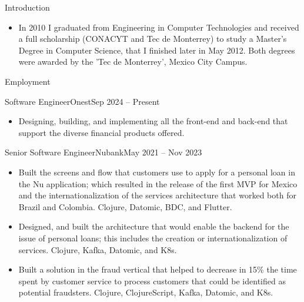 \documentclass[calibri]{../macdowell-cv/mcdowellcv}
\begin{document}
	\makeheader
	
	\begin{cvsection}{Introduction}
		\begin{cvsubsection}{}{}{}
			\begin{itemize}
					\item In 2010 I graduated from Engineering in Computer Technologies and received a full scholarship (CONACYT and Tec de Monterrey) to study a Master’s Degree in Computer Science, that I finished later in May 2012. Both degrees were awarded by the ’Tec de Monterrey’, Mexico City Campus.
			\end{itemize}
		\end{cvsubsection}
	\end{cvsection}

	\begin{cvsection}{Employment}
		\begin{cvsubsection}{Software Engineer}{Onest}{Sep 2024 -- Present}
			\begin{itemize}
                \item Designing, building, and implementing all the front-end
                    and back-end that support the diverse financial products
                    offered.
			\end{itemize}
		\end{cvsubsection}

		\begin{cvsubsection}{Senior Software Engineer}{Nubank}{May 2021 -- Nov 2023}
			\begin{itemize}
				\item Built the screens and flow that customers use to apply for a personal loan in the Nu application; which resulted in the release of the first MVP for Mexico and the internationalization of the services architecture that worked both for Brazil and Colombia. Clojure, Datomic, BDC, and Flutter.
				\item Designed, and built the architecture that would enable the backend for the issue of personal loans; this includes the creation or internationalization of services. Clojure, Kafka, Datomic, and K8s.
				\item Built a solution in the fraud vertical that helped to decrease in 15\% the time spent by customer service to process customers that could be identified as potential fraudsters. Clojure, ClojureScript, Kafka, Datomic, and K8s.
			\end{itemize}
		\end{cvsubsection}


\end{cvsection}
\end{document}
